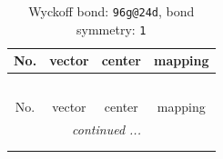 \documentclass[fleqn,8pt]{jsarticle}
\begin{document}
\renewcommand{\arraystretch}{1.2}
\begin{longtable}{cccc}
\caption{Wyckoff bond: {\tt 96g@24d}, bond symmetry: {\tt 1}}
 \\
 \hline \hline
No. & vector & center & mapping \\ \hline \endfirsthead

\multicolumn{3}{l}{\tablename\ \thetable{}} \\
 \hline \hline
No. & vector & center & mapping \\ \hline \endhead

 \hline \hline
\multicolumn{3}{r}{\footnotesize\it continued ...} \\ \endfoot

 \hline \hline
\multicolumn{3}{r}{} \\ \endlastfoot


\end{longtable}
\end{document}
